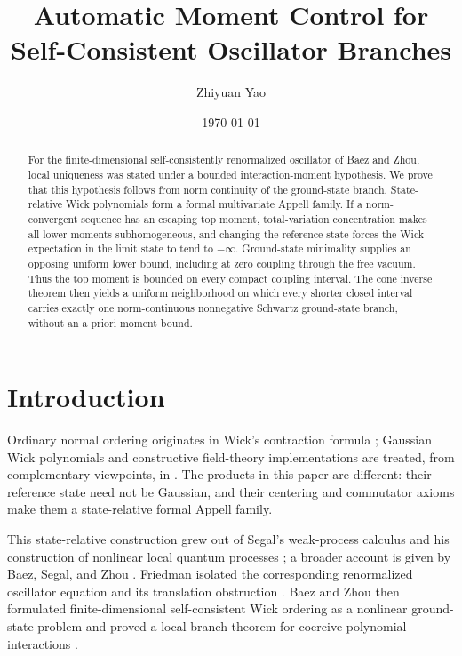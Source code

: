 \documentclass[11pt,reqno]{amsart}
\title{Automatic Moment Control for Self-Consistent Oscillator Branches}
\author{Zhiyuan Yao}
\date{\today}
\theoremstyle{plain}
\theoremstyle{definition}
\theoremstyle{remark}
\numberwithin{equation}{section}
\begin{document}
\begin{abstract}
For the finite-dimensional self-consistently renormalized oscillator of
Baez and Zhou, local uniqueness was stated under a bounded interaction-moment
hypothesis.  We prove that this hypothesis follows from norm continuity of
the ground-state branch.  State-relative Wick polynomials form a formal
multivariate Appell family.  If a norm-convergent sequence has an escaping
top moment, total-variation concentration makes all lower moments
subhomogeneous, and changing the reference state forces the Wick expectation
in the limit state to tend to $-\infty$.  Ground-state minimality supplies an
opposing uniform lower bound, including at zero coupling through the free
vacuum.  Thus the top moment is bounded on every compact coupling interval.
The cone inverse theorem then yields a uniform neighborhood on which every
shorter closed interval carries exactly one norm-continuous nonnegative
Schwartz ground-state branch, without an a priori moment bound.
\end{abstract}

\maketitle

\section{Introduction}

Ordinary normal ordering originates in Wick's contraction formula
\cite{Wick_1950te}; Gaussian Wick polynomials and constructive field-theory
implementations are treated, from complementary viewpoints, in
\cite{Janson_Book,Glimm_Book,Simon_Book,Simon_1972hs}.  The products in this
paper are different: their reference state need not be Gaussian, and their
centering and commutator axioms make them a state-relative formal Appell
family.

This state-relative construction grew out of Segal's weak-process calculus
and his construction of nonlinear local quantum processes
\cite{Segal_1969nf,Segal_1970nf,Segal_1970co,Segal_1971co}; a broader account
is given by Baez, Segal, and Zhou \cite{Baez_Book}.  Friedman isolated the
corresponding renormalized oscillator equation and its translation
obstruction \cite{Friedman_1973ro}.  Baez and Zhou then formulated
finite-dimensional self-consistent Wick ordering as a nonlinear ground-state
problem and proved a local branch theorem for coercive polynomial
interactions \cite{BaezZhou1992}.
\end{document}
